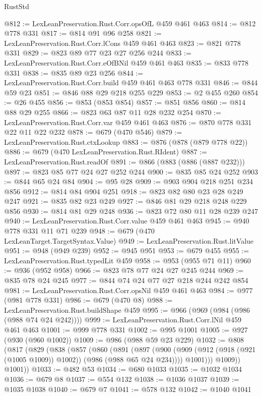 \begin{lexlean}{RustStd}
\begin{coremodule}
@812 := LexLeanPreservation.Rust.Corr.opsOfL @459 @461 @463
@814 := @812 @778 @331
@817 := @814 @91 @96 @258
@821 := LexLeanPreservation.Rust.Corr.lCons @459 @461 @463
@823 := @821 @778 @331
@829 := @823 @89 @77 @23 @27 @256 @244
@833 := LexLeanPreservation.Rust.Corr.eOfBNil @459 @461 @463
@835 := @833 @778 @331
@838 := @835 @89 @23 @256
@844 := LexLeanPreservation.Rust.Corr.build @459 @461 @463 @778 @331
@846 := @844 @59 @23
@851 := @846 @88 @29 @218 @255 @229
@853 := @2 @455 @260
@854 := @26 @455
@856 := @853 (@853 @854)
@857 := @851 @856
@860 := @814 @88 @29 @255
@866 := @823 @63 @87 @11 @28 @232 @254
@870 := LexLeanPreservation.Rust.Corr.var @459 @461 @463
@876 := @870 @778 @331 @22 @11 @22 @232
@878 := @679 (@470 @546)
@879 := LexLeanPreservation.Rust.ctxLookup
@883 := @876 (@878 (@879 @778 @22))
@886 := @679 (@470 LexLeanPreservation.Rust.RIdent)
@887 := LexLeanPreservation.Rust.readOf
@891 := @866 (@883 (@886 (@887 @232)))
@897 := @823 @85 @77 @24 @27 @252 @244
@900 := @835 @85 @24 @252
@903 := @844 @65 @24 @84
@904 := @95 @28
@909 := @903 @904 @218 @251 @234 @856
@912 := @814 @84 @904 @251
@918 := @823 @82 @80 @23 @28 @249 @247
@921 := @835 @82 @23 @249
@927 := @846 @81 @29 @218 @248 @229 @856
@930 := @814 @81 @29 @248
@936 := @823 @72 @80 @11 @28 @239 @247
@940 := LexLeanPreservation.Rust.Corr.value @459 @461 @463
@945 := @940 @778 @331 @11 @71 @239
@948 := @679 (@470 LexLeanTarget.TargetSyntax.Value)
@949 := LexLeanPreservation.Rust.litValue
@951 := @948 (@949 @239)
@952 := @945 @951
@953 := @679 @455
@955 := LexLeanPreservation.Rust.typedLit @459
@958 := @953 (@955 @71 @11)
@960 := @936 (@952 @958)
@966 := @823 @78 @77 @24 @27 @245 @244
@969 := @835 @78 @24 @245
@977 := @844 @74 @24 @77 @27 @218 @244 @242 @854
@981 := LexLeanPreservation.Rust.Corr.opsNil @459 @461 @463
@984 := @977 (@981 @778 @331)
@986 := @679 (@470 @8)
@988 := LexLeanPreservation.Rust.buildShape @459
@995 := @966 (@969 (@984 (@986 (@988 @74 @24 @242))))
@999 := LexLeanPreservation.Rust.Corr.lNil @459 @461 @463
@1001 := @999 @778 @331
@1002 := @995 @1001
@1005 := @927 (@930 (@960 @1002))
@1009 := @986 (@988 @59 @23 @229)
@1032 := @808
    (@817
      (@829
        (@838
          (@857
            (@860
              (@891
                (@897
                  (@900 (@909 (@912 (@918 (@921 (@1005 @1009)) @1002)) (@986 (@988 @65 @24 @234))))
                  @1001)))
            @1009))
        @1001))
@1033 := @482 @53
@1034 := @680 @1033
@1035 := @1032 @1034
@1036 := @679 @8
@1037 := @554 @132
@1038 := @1036 @1037
@1039 := @1035 @1038
@1040 := @679 @7
@1041 := @578 @132
@1042 := @1040 @1041

\end{coremodule}
\end{lexlean}
